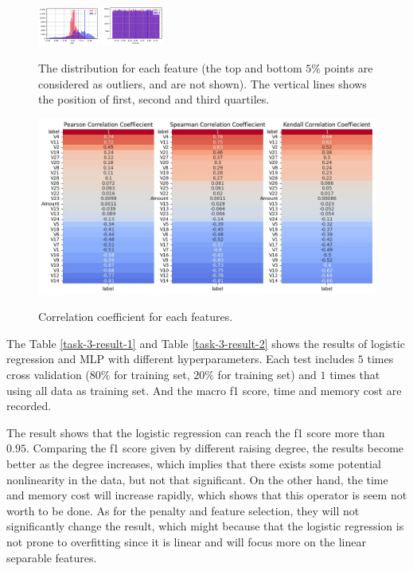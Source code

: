 \documentclass[11pt]{article}
\begin{document}
\begin{figure}[H]
  \includegraphics[width=0.18\textwidth]{../code/Task3/Analysis/Hist-V28.jpg}
  \includegraphics[width=0.18\textwidth]{../code/Task3/Analysis/Hist-Amount.jpg}
  \caption{The distribution for each feature (the top and bottom $5\%$ points are considered as outliers, and are not shown). The vertical lines shows the position of first, second and third quartiles.}
  \label{task-3-data-distribution-feature}
\end{figure}

\begin{figure}[H]
  \centering
  \includegraphics[width=\textwidth]{../code/Task3/Analysis/corrcoef.jpg} \\
  \caption{Correlation coefficient for each features.}
  \label{task-3-correlation-coefficient}
\end{figure}

The Table \ref{task-3-result-1} and Table \ref{task-3-result-2} shows the results of logistic regression and MLP with different hyperparameters. Each test includes $5$ times cross validation ($80\%$ for training set, $20\%$ for training set) and $1$ times that using all data as training set. And the macro f1 score, time and memory cost are recorded.

The result shows that the logistic regression can reach the f1 score more than $0.95$. Comparing the f1 score given by different raising degree, the results become better as the degree increases, which implies that there exists some potential nonlinearity in the data, but not that significant. On the other hand, the time and memory cost will increase rapidly, which shows that this operator is seem not worth to be done. As for the penalty and feature selection, they will not significantly change the result, which might because that the logistic regression is not prone to overfitting since it is linear and will focus more on the linear separable features.
\end{document}
